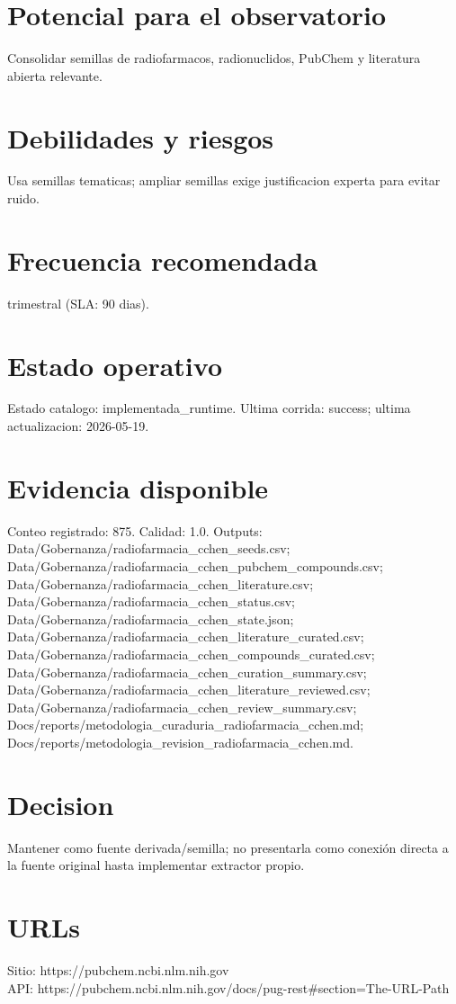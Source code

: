 \documentclass[10pt,a4paper]{article}
\begin{document}
\section*{Potencial para el observatorio}
Consolidar semillas de radiofarmacos, radionuclidos, PubChem y literatura abierta relevante.

\section*{Debilidades y riesgos}
Usa semillas tematicas; ampliar semillas exige justificacion experta para evitar ruido.

\section*{Frecuencia recomendada}
trimestral (SLA: 90 dias).

\section*{Estado operativo}
Estado catalogo: implementada\_runtime. Ultima corrida: success; ultima actualizacion: 2026-05-19.

\section*{Evidencia disponible}
Conteo registrado: 875. Calidad: 1.0. Outputs: Data/Gobernanza/radiofarmacia\_cchen\_seeds.csv; Data/Gobernanza/radiofarmacia\_cchen\_pubchem\_compounds.csv; Data/Gobernanza/radiofarmacia\_cchen\_literature.csv; Data/Gobernanza/radiofarmacia\_cchen\_status.csv; Data/Gobernanza/radiofarmacia\_cchen\_state.json; Data/Gobernanza/radiofarmacia\_cchen\_literature\_curated.csv; Data/Gobernanza/radiofarmacia\_cchen\_compounds\_curated.csv; Data/Gobernanza/radiofarmacia\_cchen\_curation\_summary.csv; Data/Gobernanza/radiofarmacia\_cchen\_literature\_reviewed.csv; Data/Gobernanza/radiofarmacia\_cchen\_review\_summary.csv; Docs/reports/metodologia\_curaduria\_radiofarmacia\_cchen.md; Docs/reports/metodologia\_revision\_radiofarmacia\_cchen.md.

\section*{Decision}
Mantener como fuente derivada/semilla; no presentarla como conexión directa a la fuente original hasta implementar extractor propio.


\section*{URLs}
Sitio: https://pubchem.ncbi.nlm.nih.gov\\
API: https://pubchem.ncbi.nlm.nih.gov/docs/pug-rest\#section=The-URL-Path
\end{document}
